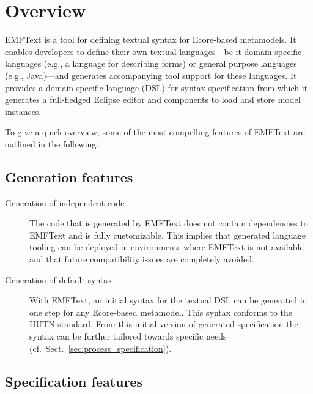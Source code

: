 \chapter{Overview}
EMFText is a tool for defining textual syntax for Ecore-based metamodels. It 
enables developers to define their own textual languages---be it domain
specific languages (e.g., a language for describing forms) or general purpose 
languages (e.g., Java)---and generates accompanying tool support for these 
languages. It provides a domain specific language (DSL) for syntax 
specification from which it generates a full-fledged Eclipse editor and 
components to load and store model instances.

To give a quick overview, some of the most compelling features of EMFText are 
outlined in the following.

\section{Generation features}

\begin{description}

  \item[Generation of independent code]
        The code that is generated by EMFText does not contain dependencies
        to EMFText and is fully customizable. This implies that generated 
        language tooling can be deployed in environments where EMFText is not 
        available and that future compatibility issues are completely avoided.

  \item[Generation of default syntax]
        With EMFText, an initial syntax for the textual DSL can be generated 
        in one step for any Ecore-based metamodel. This syntax conforms to the 
        HUTN standard. From this initial version of generated specification the 
        syntax can be further tailored towards specific needs (cf.~Sect.~\ref{sec:process_specification}).

\end{description}


\section{Specification features}

